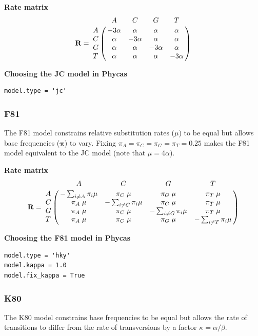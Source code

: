 \documentclass[10pt]{article}
\newcommand{\phycas}{{\sc Phycas}\index{Phycas}}
\newcommand{\Rii}[1]{-\sum_{i \neq #1} \pi_i \mu}
\begin{document}
\begin{samepage}
{\bf Rate matrix}
$${\bf R} = \bordermatrix{ &     A     &     C     &     G     &   T       \cr
                         A & -3 \alpha &  \alpha   &  \alpha   &  \alpha   \cr
                         C &  \alpha   & -3 \alpha &  \alpha   &  \alpha   \cr
                         G &  \alpha   &  \alpha   & -3 \alpha &  \alpha   \cr
                         T &  \alpha   &  \alpha   &  \alpha   & -3 \alpha \cr}$$
\end{samepage}

\begin{samepage}
{\bf Choosing the JC model in \phycas}
\begin{verbatim}
model.type = 'jc'
\end{verbatim}
\end{samepage}

\subsubsection{F81}

The F81 model \citep{Felsenstein1981} constrains relative substitution rates ($\mu$) to be equal but allows base frequencies ($\bm \pi$) to vary. Fixing $\pi_A = \pi_C = \pi_G = \pi_T = 0.25$ makes the F81 model equivalent to the JC model (note that $\mu = 4 \alpha$).

\begin{samepage}
{\bf Rate matrix}
$${\bf R} = \bordermatrix{ &       A      &       C       &       G       &       T       \cr
                         A &    \Rii{A}   & \pi_C \; \mu  & \pi_G \; \mu  & \pi_T \; \mu  \cr
                         C & \pi_A \; \mu &    \Rii{C}    & \pi_G \; \mu  & \pi_T \; \mu  \cr
                         G & \pi_A \; \mu & \pi_C \; \mu  &    \Rii{G}    & \pi_T \; \mu  \cr
                         T & \pi_A \; \mu & \pi_C \; \mu  & \pi_G \; \mu  &     \Rii{T}   \cr}$$                                                         
\end{samepage}

\begin{samepage}
{\bf Choosing the F81 model in \phycas}
\begin{verbatim}
model.type = 'hky'
model.kappa = 1.0
model.fix_kappa = True
\end{verbatim}
\end{samepage}

\subsubsection{K80}
The K80 model \citep{Kimura1980} constrains base frequencies to be equal but allows the rate of transitions to differ from the rate of transversions by a factor $\kappa = \alpha/\beta$.
\end{document}
